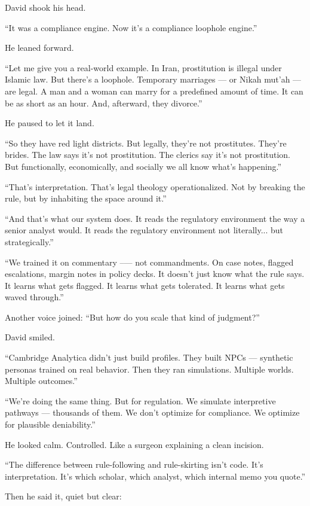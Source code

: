 David shook his head.

``It was a compliance engine. Now it's a compliance loophole engine.''

He leaned forward.

``Let me give you a real-world example. 
In Iran, prostitution is illegal under Islamic law. 
But there’s a loophole. Temporary marriages --- or Nikah mut’ah --- are legal. 
A man and a woman can marry for a predefined amount of time. 
It can be as short as an hour. 
And, afterward, they divorce.''

He paused to let it land.

``So they have red light districts. 
But legally, they’re not prostitutes. 
They’re brides. 
The law says it’s not prostitution. 
The clerics say it’s not prostitution. 
But functionally, economically, and socially we all know what’s happening.''

``That’s interpretation. 
That’s legal theology operationalized. 
Not by breaking the rule, but by inhabiting the space around it.''

``And that’s what our system does. 
It reads the regulatory environment the way a senior analyst would. 
It reads the regulatory environment not literally... but strategically.''

``We trained it on commentary --— not commandments. 
On case notes, flagged escalations, margin notes in policy decks. 
It doesn’t just know what the rule says. 
It learns what gets flagged. 
It learns what gets tolerated. 
It learns what gets waved through.''

Another voice joined: ``But how do you scale that kind of judgment?''

David smiled.

``Cambridge Analytica didn’t just build profiles. 
They built NPCs — synthetic personas trained on real behavior. 
Then they ran simulations. Multiple worlds. Multiple outcomes.''

``We’re doing the same thing. 
But for regulation. 
We simulate interpretive pathways — thousands of them. 
We don’t optimize for compliance. 
We optimize for plausible deniability.''

He looked calm. Controlled. Like a surgeon explaining a clean incision.

``The difference between rule-following and rule-skirting isn’t code. 
It’s interpretation. 
It’s which scholar, which analyst, which internal memo you quote.''

Then he said it, quiet but clear:

